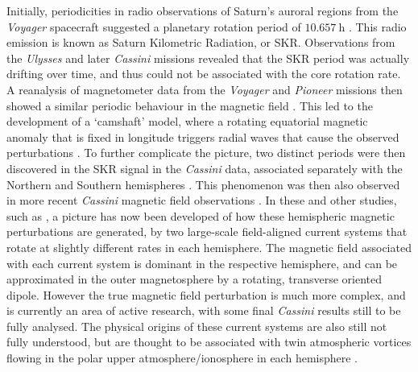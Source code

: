 Initially, periodicities in radio observations of Saturn's auroral regions from the \textit{Voyager} spacecraft suggested a planetary rotation period of $\SI{10.657}{\hour}$ \citep{desch1981}. This radio emission is known as Saturn Kilometric Radiation, or SKR. Observations from the \textit{Ulysses} \citep{lecacheux1997} and later \textit{Cassini} \citep{gurnett2005} missions revealed that the SKR period was actually drifting over time, and thus could not be associated with the core rotation rate. A reanalysis of magnetometer data from the \textit{Voyager} and \textit{Pioneer} missions then showed a similar periodic behaviour in the magnetic field \citep{espinosa2000}. This led to the development of a `camshaft' model, where a rotating equatorial magnetic anomaly that is fixed in longitude triggers radial waves that cause the observed perturbations \citep{espinosa2003b}. To further complicate the picture, two distinct periods were then discovered in the SKR signal in the \textit{Cassini} data, associated separately with the Northern and Southern hemispheres \citep{gurnett2009}. This phenomenon was then also observed in more recent \textit{Cassini} magnetic field observations \citep[e.g.][]{andrews2010,provan2012}. In these and other studies, such as \citet{hunt2014}, a picture has now been developed of how these hemispheric magnetic perturbations are generated, by two large-scale field-aligned current systems that rotate at slightly different rates in each hemisphere. The magnetic field associated with each current system is dominant in the respective hemisphere, and can be approximated in the outer magnetosphere by a rotating, transverse oriented dipole. However the true magnetic field perturbation is much more complex, and is currently an area of active research, with some final \textit{Cassini} results still to be fully analysed. The physical origins of these current systems are also still not fully understood, but are thought to be associated with twin atmospheric vortices flowing in the polar upper atmosphere/ionosphere in each hemisphere \citep{jiaandkivelson2012, southwood2014, smith2016}. 

